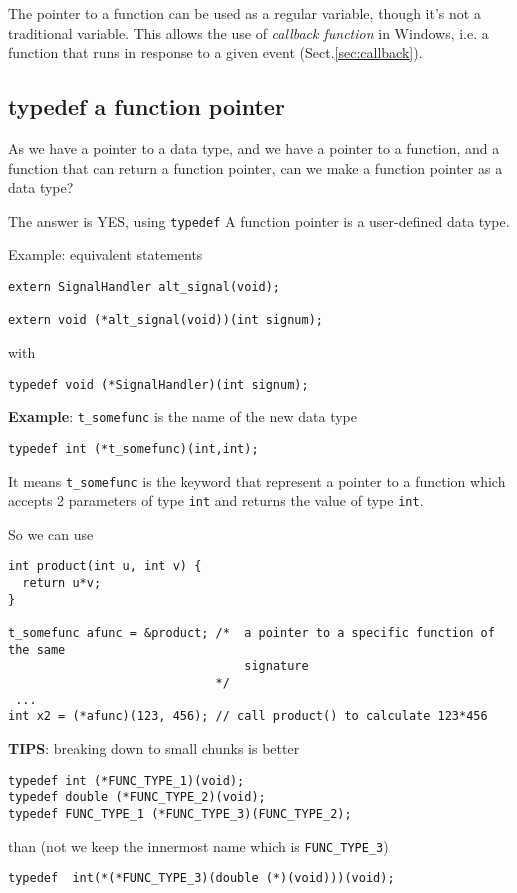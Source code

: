 The pointer to a function can be used as a regular variable, though it's not a
traditional variable. This allows the use of {\it callback function} in Windows,
i.e. a function that runs in response to a given event
(Sect.\ref{sec:callback}).

\subsection{typedef a function pointer}
\label{sec:typedef-function-pointer}

As we have a pointer to a data type, and we have a pointer to a function, and a
function that can return a function pointer, can we make a function pointer as a
data type?

The answer is YES, using \verb!typedef! A function pointer is a user-defined
data type.


Example: equivalent statements
\begin{verbatim}
extern SignalHandler alt_signal(void);

extern void (*alt_signal(void))(int signum);
\end{verbatim}
with
\begin{verbatim}
typedef void (*SignalHandler)(int signum);
\end{verbatim}

% 

{\bf Example}: \verb!t_somefunc! is the name of the new data type
\begin{verbatim}
typedef int (*t_somefunc)(int,int);
\end{verbatim}
It means \verb!t_somefunc! is the keyword that represent a pointer to a function
which accepts 2 parameters of type \verb!int! and returns the value of type
\verb!int!.

So we can use
\begin{verbatim}
int product(int u, int v) {
  return u*v;
}

t_somefunc afunc = &product; /*  a pointer to a specific function of the same
                                 signature
                             */
 ...
int x2 = (*afunc)(123, 456); // call product() to calculate 123*456
\end{verbatim}

{\bf TIPS}: breaking down to small chunks is better
\begin{verbatim}
typedef int (*FUNC_TYPE_1)(void);
typedef double (*FUNC_TYPE_2)(void);
typedef FUNC_TYPE_1 (*FUNC_TYPE_3)(FUNC_TYPE_2);
\end{verbatim}
than (not we keep the innermost name which is \verb!FUNC_TYPE_3!)
\begin{verbatim}
typedef  int(*(*FUNC_TYPE_3)(double (*)(void)))(void);
\end{verbatim}

